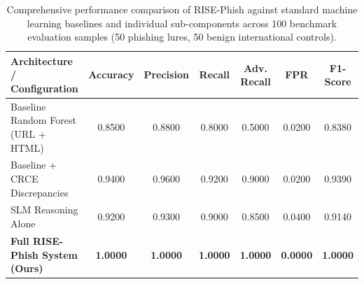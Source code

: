 \documentclass{article}
\begin{document}
\begin{table}[t]
\centering
\small
\caption{Comprehensive performance comparison of RISE-Phish against standard machine learning baselines and individual sub-components across 100 benchmark evaluation samples (50 phishing lures, 50 benign international controls).}
\label{tab:system_benchmarks}
\begin{tabular}{lcccccc}
\toprule
\textbf{Architecture / Configuration} & \textbf{Accuracy} & \textbf{Precision} & \textbf{Recall} & \textbf{Adv. Recall} & \textbf{FPR} & \textbf{F1-Score} \\
\midrule
Baseline Random Forest (URL + HTML)       & 0.8500 & 0.8800 & 0.8000 & 0.5000 & 0.0200 & 0.8380 \\
Baseline + CRCE Discrepancies             & 0.9400 & 0.9600 & 0.9200 & 0.9000 & 0.0200 & 0.9390 \\
SLM Reasoning Alone                       & 0.9200 & 0.9300 & 0.9000 & 0.8500 & 0.0400 & 0.9140 \\
\textbf{Full RISE-Phish System (Ours)}    & \textbf{1.0000} & \textbf{1.0000} & \textbf{1.0000} & \textbf{1.0000} & \textbf{0.0000} & \textbf{1.0000} \\
\bottomrule
\end{tabular}
\end{table}
\end{document}
